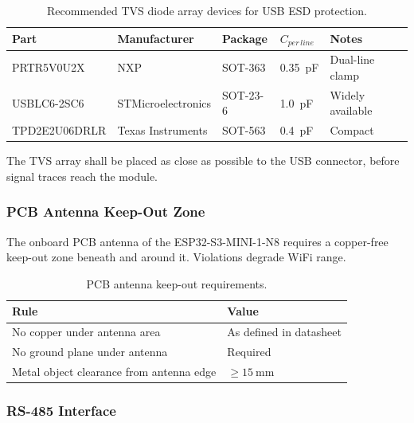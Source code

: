 \begin{table}[H]
  \caption{Recommended \ac{TVS} diode array devices for \ac{USB} \ac{ESD} protection.}
  \label{tab:tvs_parts}
  \centering
  \begin{tabularx}{\textwidth}{|l|X|l|l|X|}
    \hline
    \textbf{Part} & \textbf{Manufacturer} & \textbf{Package} & \textbf{$C_{per\,line}$} & \textbf{Notes} \\ \hline \hline
    PRTR5V0U2X     & NXP                & SOT-363  & \SI{0.35}{\pico\farad} & Dual-line clamp \\ \hline
    USBLC6-2SC6    & STMicroelectronics & SOT-23-6 & \SI{1.0}{\pico\farad}  & Widely available \\ \hline
    TPD2E2U06DRLR  & Texas Instruments  & SOT-563  & \SI{0.4}{\pico\farad}  & Compact \\ \hline
  \end{tabularx}
\end{table}

The \ac{TVS} array shall be placed as close as possible to the \ac{USB} connector, before signal
traces reach the module.

\subsubsection{\ac{PCB} Antenna Keep-Out Zone}
\label{sec:antenna_keepout}

The onboard \ac{PCB} antenna of the ESP32-S3-MINI-1-N8 requires a copper-free keep-out zone beneath
and around it. Violations degrade \ac{WiFi} range.

\begin{table}[H]
  \caption{\ac{PCB} antenna keep-out requirements.}
  \label{tab:antenna_keepout}
  \centering
  \begin{tabularx}{\textwidth}{|X|X|}
    \hline
    \textbf{Rule} & \textbf{Value} \\ \hline \hline
    No copper under antenna area             & As defined in datasheet \\ \hline
    No ground plane under antenna            & Required \\ \hline
    Metal object clearance from antenna edge & $\geq \SI{15}{\milli\metre}$ \\ \hline
  \end{tabularx}
\end{table}

\subsubsection{RS-485 Interface}
\label{sec:rs485}

